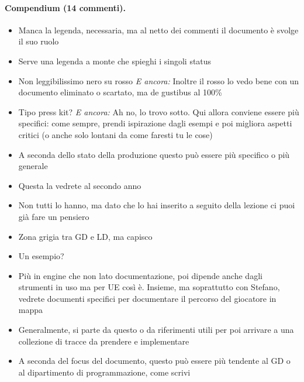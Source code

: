 \paragraph{Compendium (14 commenti).}
{\small
\begin{itemize}
  \item {} Manca la legenda, necessaria, ma al netto dei commenti il documento è svolge il suo ruolo
  \item {} Serve una legenda a monte che spieghi i singoli status
  \item {} Non leggibilissimo nero su rosso \emph{E ancora:} Inoltre il rosso lo vedo bene con un documento eliminato o scartato, ma de gustibus al 100\%
  \item {} Tipo press kit? \emph{E ancora:} Ah no, lo trovo sotto. Qui allora conviene essere più specifici: come sempre, prendi ispirazione dagli esempi e poi migliora aspetti critici (o anche solo lontani da come faresti tu le cose)
  \item {} A seconda dello stato della produzione questo può essere più specifico o più generale
  \item {} Questa la vedrete al secondo anno
  \item {} Non tutti lo hanno, ma dato che lo hai inserito a seguito della lezione ci puoi già fare un pensiero
  \item {} Zona grigia tra GD e LD, ma capisco
  \item {} Un esempio?
  \item {} Più in engine che non lato documentazione, poi dipende anche dagli strumenti in uso ma per UE così è. Insieme, ma soprattutto con Stefano, vedrete documenti specifici per documentare il percorso del giocatore in mappa
  \item {} Generalmente, si parte da questo o da riferimenti utili per poi arrivare a una collezione di tracce da prendere e implementare
  \item {} A seconda del focus del documento, questo può essere più tendente al GD o al dipartimento di programmazione, come scrivi
\end{itemize}
}

